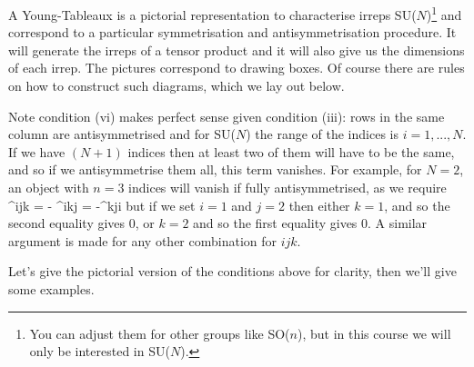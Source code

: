 A Young-Tableaux is a pictorial representation to characterise irreps SU($N$)\footnote{You can adjust them for other groups like SO($n$), but in this course we will only be interested in SU($N$).} and correspond to a particular symmetrisation and antisymmetrisation procedure. It will generate the irreps of a tensor product and it will also give us the dimensions of each irrep. The pictures correspond to drawing boxes. Of course there are rules on how to construct such diagrams, which we lay out below. 


\br 
\label{rem:NRowsYT}
    Note condition (vi) makes perfect sense given condition (iii): rows in the same column are antisymmetrised and for SU($N$) the range of the indices is $i=1,...,N$. If we have $(N+1)$ indices then at least two of them will have to be the same, and so if we antisymmetrise them all, this term vanishes. For example, for $N=2$, an object with $n=3$ indices will vanish if fully antisymmetrised, as we require 
    \bse 
        \phi^{ijk} = - \phi^{ikj} = -\phi^{kji}
    \ese 
    but if we set $i=1$ and $j=2$ then either $k=1$, and so the second equality gives 0, or $k=2$ and so the first equality gives 0. A similar argument is made for any other combination for $ijk$. 
\er 

Let's give the pictorial version of the conditions above for clarity, then we'll give some examples. 

